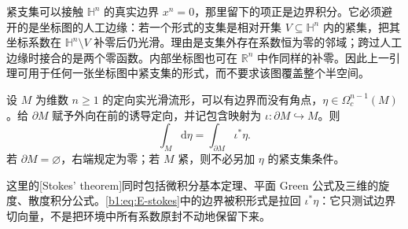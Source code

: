 紧支集可以接触 \(\mathbb H^n\) 的真实边界 \(x^n=0\)，那里留下的项正是边界积分。它必须避开的是坐标图的人工边缘：若一个形式的支集是相对开集 \(V\subseteq \mathbb H^n\) 内的紧集，把其坐标系数在 \(\mathbb H^n\setminus V\) 补零后仍光滑。理由是支集外存在系数恒为零的邻域；跨过人工边缘时接合的是两个零函数。内部坐标图也可在 \(\mathbb R^n\) 中作同样的补零。因此上一引理可用于任何一张坐标图中紧支集的形式，而不要求该图覆盖整个半空间。

\begin{theorem}[Stokes]\label{b1:thm:E-stokes}
设 \(M\) 为维数 \(n\geq1\) 的定向实光滑流形，可以有边界而没有角点，\(\eta\in\Omega_c^{n-1}(M)\)。给 \(\partial M\) 赋予外向在前的诱导定向，并记包含映射为 \(\iota:\partial M\hookrightarrow M\)。则
\begin{equation}\label{b1:eq:E-stokes}
 \int_M\mathrm d\eta=\int_{\partial M}\iota^*\eta.
\end{equation}
若 \(\partial M=\varnothing\)，右端规定为零；若 \(M\) 紧，则不必另加 \(\eta\) 的紧支集条件。
\end{theorem}

这里的[Stokes' theorem]同时包括微积分基本定理、平面 Green 公式及三维的旋度、散度积分公式。\eqref{b1:eq:E-stokes}中的边界被积形式是拉回 \(\iota^*\eta\)：它只测试边界切向量，不是把环境中所有系数原封不动地保留下来。

